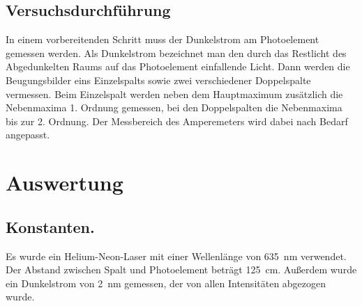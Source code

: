\subsection{Versuchsdurchführung}
In einem vorbereitenden Schritt muss der Dunkelstrom am Photoelement gemessen werden.
Als Dunkelstrom bezeichnet man den durch das Restlicht des Abgedunkelten Raums auf das
Photoelement einfallende Licht. Dann werden die Beugungsbilder eins Einzelspalts
sowie zwei verschiedener Doppelspalte vermessen. Beim Einzelspalt werden neben dem
Hauptmaximum zusätzlich die Nebenmaxima 1. Ordnung gemessen, bei den Doppelspalten
die Nebenmaxima bis zur 2. Ordnung. Der Messbereich des Amperemeters wird dabei
nach Bedarf angepasst.
\section{Auswertung}
\subsection{Konstanten.}
Es wurde ein Helium-Neon-Laser mit einer Wellenlänge von \SI{635}{\nano\meter} verwendet.
Der Abstand zwischen Spalt und Photoelement beträgt \SI{125}{\centi\meter}. Außerdem wurde
ein Dunkelstrom von \SI{2}{\nano\meter} gemessen, der von allen Intensitäten abgezogen wurde.
